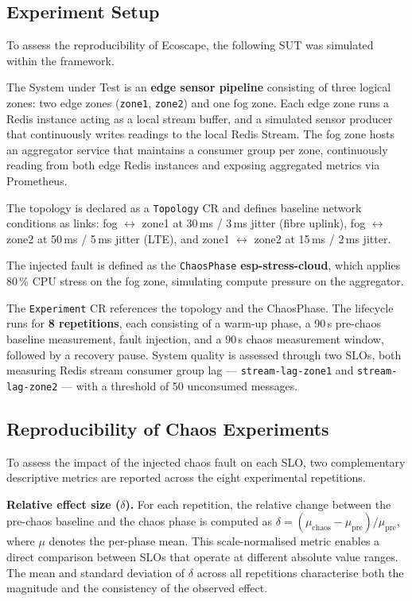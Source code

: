 \documentclass[12pt, a4paper]{article}
\begin{document}
\subsection*{Experiment Setup}

To assess the reproducibility of Ecoscape, the following SUT was simulated within the framework.

The System under Test is an \textbf{edge sensor pipeline} consisting of three logical zones:
two edge zones (\texttt{zone1}, \texttt{zone2}) and one fog zone. Each edge zone runs a
Redis instance acting as a local stream buffer, and a simulated sensor producer that
continuously writes readings to the local Redis Stream. The fog zone hosts an aggregator
service that maintains a consumer group per zone, continuously reading from both edge
Redis instances and exposing aggregated metrics via Prometheus.

The topology is declared as a \texttt{Topology} CR and defines baseline network conditions
as links: fog $\leftrightarrow$ zone1 at 30\,ms / 3\,ms jitter (fibre uplink),
fog $\leftrightarrow$ zone2 at 50\,ms / 5\,ms jitter (LTE), and zone1 $\leftrightarrow$
zone2 at 15\,ms / 2\,ms jitter.

The injected fault is defined as the \texttt{ChaosPhase} \textbf{esp-stress-cloud}, which
applies 80\,\% CPU stress on the fog zone, simulating compute pressure on the aggregator.

The \texttt{Experiment} CR references the topology and the ChaosPhase. The lifecycle runs
for \textbf{8 repetitions}, each consisting of a warm-up phase, a 90\,s pre-chaos baseline
measurement, fault injection, and a 90\,s chaos measurement window, followed by a recovery
pause. System quality is assessed through two SLOs, both measuring Redis stream consumer
group lag --- \texttt{stream-lag-zone1} and \texttt{stream-lag-zone2} --- with a threshold
of 50 unconsumed messages.

\subsection*{Reproducibility of Chaos Experiments}

To assess the impact of the injected chaos fault on each SLO, two complementary
descriptive metrics are reported across the eight experimental repetitions.

\textbf{Relative effect size ($\delta$).} For each repetition, the relative change
between the pre-chaos baseline and the chaos phase is computed as
$\delta = (\mu_{\text{chaos}} - \mu_{\text{pre}}) / \mu_{\text{pre}}$,
where $\mu$ denotes the per-phase mean. This scale-normalised metric enables a
direct comparison between SLOs that operate at different absolute value ranges.
The mean and standard deviation of $\delta$ across all repetitions characterise
both the magnitude and the consistency of the observed effect.
\end{document}
